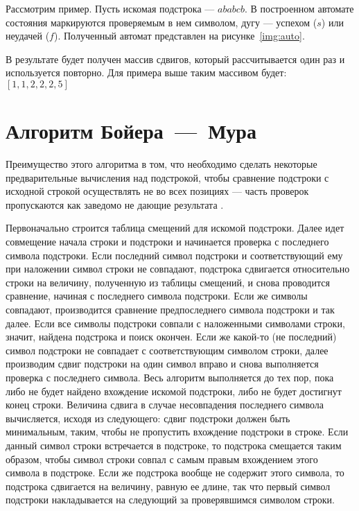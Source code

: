 Рассмотрим пример. Пусть искомая подстрока --- $ababcb$. В построенном автомате состояния маркируются проверяемым в нем символом, дугу --- успехом ($s$) или неудачей ($f$). Полученный автомат представлен на рисунке~\ref{img:auto}.


В результате будет получен массив сдвигов, который рассчитывается один раз и используется повторно. Для примера выше таким массивом будет:~$[1, 1, 2, 2, 2, 5]$

\section{Алгоритм Бойера~---~Мура}

Преимущество этого алгоритма в том, что необходимо сделать некоторые предварительные вычисления над подстрокой, чтобы сравнение подстроки с исходной строкой осуществлять не во всех позициях --- часть проверок пропускаются как заведомо не дающие результата \cite{bm}. 

Первоначально строится таблица смещений для искомой подстроки. Далее идет совмещение начала строки и подстроки и начинается проверка с последнего символа подстроки. 
Если последний символ подстроки и соответствующий ему при наложении символ строки не совпадают, подстрока сдвигается относительно строки на величину, полученную из таблицы смещений, и снова проводится сравнение, начиная с последнего символа подстроки. 
Если же символы совпадают, производится сравнение предпоследнего символа подстроки и так далее. 
Если все символы подстроки совпали с наложенными символами строки, значит, найдена подстрока и поиск окончен. 
Если же какой-то (не последний) символ подстроки не совпадает с соответствующим символом строки, далее производим сдвиг подстроки на один символ вправо и снова выполняется проверка с последнего символа. 
Весь алгоритм выполняется до тех пор, пока либо не будет найдено вхождение искомой подстроки, либо не будет достигнут конец строки. 
Величина сдвига в случае несовпадения последнего символа вычисляется, исходя из следующего: сдвиг подстроки должен быть минимальным, таким, чтобы не пропустить вхождение подстроки в строке. 
Если данный символ строки встречается в подстроке, то подстрока смещается таким образом, чтобы символ строки совпал с самым правым вхождением этого символа в подстроке. 
Если же подстрока вообще не содержит этого символа, то подстрока сдвигается на величину, равную ее длине, так что первый символ подстроки накладывается на следующий за проверявшимся символом строки.


